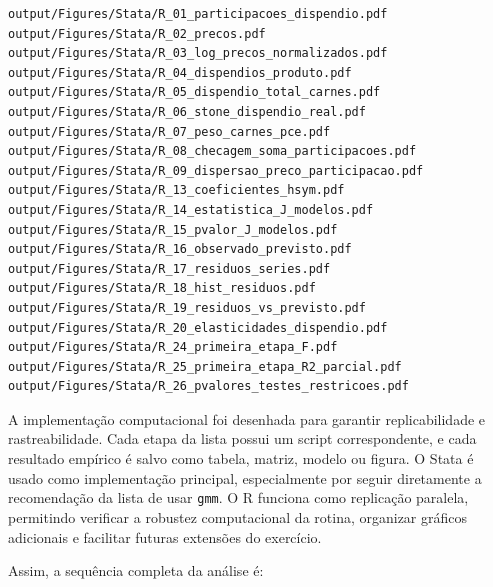 \documentclass[12pt,a4paper]{article}
\begin{document}
\begin{verbatim}
output/Figures/Stata/R_01_participacoes_dispendio.pdf
output/Figures/Stata/R_02_precos.pdf
output/Figures/Stata/R_03_log_precos_normalizados.pdf
output/Figures/Stata/R_04_dispendios_produto.pdf
output/Figures/Stata/R_05_dispendio_total_carnes.pdf
output/Figures/Stata/R_06_stone_dispendio_real.pdf
output/Figures/Stata/R_07_peso_carnes_pce.pdf
output/Figures/Stata/R_08_checagem_soma_participacoes.pdf
output/Figures/Stata/R_09_dispersao_preco_participacao.pdf
output/Figures/Stata/R_13_coeficientes_hsym.pdf
output/Figures/Stata/R_14_estatistica_J_modelos.pdf
output/Figures/Stata/R_15_pvalor_J_modelos.pdf
output/Figures/Stata/R_16_observado_previsto.pdf
output/Figures/Stata/R_17_residuos_series.pdf
output/Figures/Stata/R_18_hist_residuos.pdf
output/Figures/Stata/R_19_residuos_vs_previsto.pdf
output/Figures/Stata/R_20_elasticidades_dispendio.pdf
output/Figures/Stata/R_24_primeira_etapa_F.pdf
output/Figures/Stata/R_25_primeira_etapa_R2_parcial.pdf
output/Figures/Stata/R_26_pvalores_testes_restricoes.pdf
\end{verbatim}

A implementação computacional foi desenhada para garantir replicabilidade e rastreabilidade. Cada etapa da lista possui um script correspondente, e cada resultado empírico é salvo como tabela, matriz, modelo ou figura. O Stata é usado como implementação principal, especialmente por seguir diretamente a recomendação da lista de usar \texttt{gmm}. O R funciona como replicação paralela, permitindo verificar a robustez computacional da rotina, organizar gráficos adicionais e facilitar futuras extensões do exercício.

Assim, a sequência completa da análise é:
\end{document}
